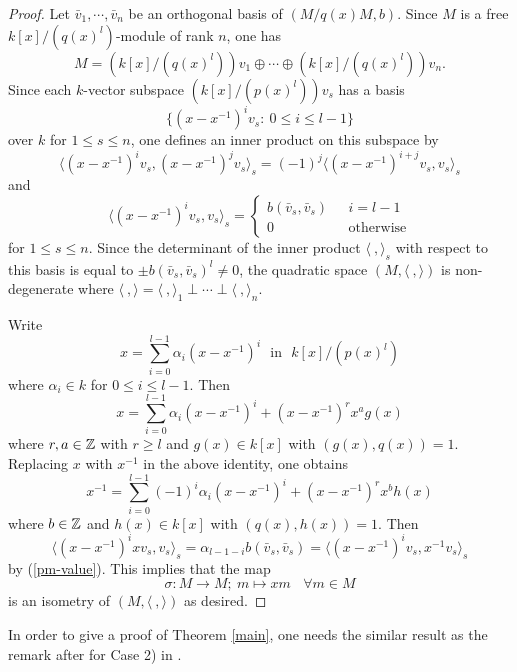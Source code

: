 \documentclass[12pt]{amsart}
\begin{document}
\begin{proof} Let $\bar v_1, \cdots, \bar v_n$ be an orthogonal basis of $(M/q(x)M, b)$. Since $M$ is a free $k[x]/(q(x)^l)$-module of rank $n$, one has 
$$ M = (k[x]/(q(x)^l) )v_1 \oplus \cdots \oplus (k[x]/(q(x)^l)) v_n .$$
Since each $k$-vector subspace $(k[x]/(p(x)^l) )v_s$ has a basis $$\{ (x-x^{-1})^i v_s: \ 0 \leq i \leq l-1 \} $$ over $k$ for $1\leq s\leq n$, one defines an inner product on this subspace by
\begin{equation} \label{inner}  \langle (x-x^{-1})^{i} v_s, (x-x^{-1})^{j}v_s \rangle_s = (-1)^j \langle (x-x^{-1})^{i+j}  v_s, v_s \rangle_s \end{equation}
and 
 \begin{equation} \label{pm-value} \langle (x-x^{-1})^i v_s, v_s \rangle_s= \begin{cases} b(\bar v_s, \bar v_s)  \ \ \ & i=l-1\\  
0 \ \ \ & \text{otherwise} \end{cases} \end{equation} 
 for $1\leq s\leq n$.  Since the determinant of the inner product $\langle \ , \rangle_s$ with respect to this basis is equal to $\pm b(\bar v_s, \bar v_s)^l \neq 0$, the quadratic space $(M, \langle \ , \rangle)$ is non-degenerate where $\langle \ , \rangle = \langle \ , \rangle_1 \perp \cdots \perp \langle \ , \rangle_n$.  

Write 
$$ x= \sum_{i=0}^{l-1} \alpha_i (x-x^{-1})^i \ \ \ \text{in} \ \ \ k[x]/(p(x)^l) $$  where $\alpha_i \in k$ for $0\leq i\leq l-1$.  Then 
$$ x= \sum_{i=0}^{l-1} \alpha_i (x-x^{-1})^i +(x-x^{-1})^r x^a g(x) $$ where $r, a\in \Bbb Z$ with $r\geq l$ and $g(x)\in k[x]$ with $(g(x), q(x))=1$. Replacing $x$ with $x^{-1}$ in the above identity, one obtains 
 $$x^{-1} = \sum_{i=0}^{l-1} (-1)^i \alpha_i (x-x^{-1})^i + (x-x^{-1})^r x^b h(x) $$ 
where $b\in \Bbb Z$ and $h(x)\in k[x]$ with $(q(x), h(x))=1$. Then 
$$\langle (x-x^{-1})^i x v_s, v_s \rangle_s= \alpha_{l-1-i} b(\bar v_s, \bar v_s)= \langle (x-x^{-1})^i v_s, x^{-1} v_s \rangle_s  $$
by (\ref{pm-value}). This implies that the map 
 $$\sigma: M \longrightarrow M; \ m \mapsto x m \ \ \ \ \forall m\in M$$ is an isometry of $(M, \langle \ , \rangle )$ as desired. 
\end{proof}


In order to give a proof of Theorem \ref{main}, one needs the similar result as the remark after \cite[Theorem 3.3]{Mil} for Case 2) in \cite{Mil}.
\end{document}

